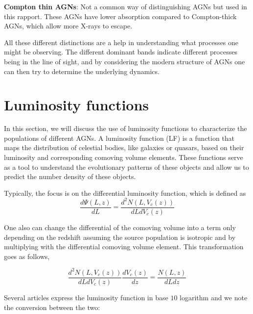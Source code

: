 \documentclass{article}
\begin{document}
\textbf{Compton thin AGNs}: 
Not a common way of distinguishing AGNs but used in this rapport. These AGNs have lower absorption compared to Compton-thick AGNs, which allow more X-rays to escape. 



All these different distinctions are a help in understanding what processes one might be observing. The different
dominant bands indicate different processes being in the line of sight, and by considering the modern structure of 
AGNs one can then try to determine the underlying dynamics.  

 



\section{ Luminosity functions}
In this section, we will discuss the use of luminosity functions to characterize the populations of different AGNs. 
A luminosity function (LF) is a function that maps the distribution of celestial bodies, like galaxies or quasars,
based on their luminosity and corresponding comoving volume elements. These functions serve as a tool to understand the evolutionary patterns of these objects and allow us 
to predict the number density of these objects. 

Typically, the focus is on the differential luminosity function, which is defined as
\begin{equation}
    \frac{d\Psi(L,z)}{dL} = \frac{d^2N(L,V_c(z))}{dLdV_c(z)}
\end{equation}

One also can change the differential of the comoving volume into a term only depending on the redshift assuming the source population is isotropic and by multiplying with the differential comoving volume element. This 
transformation goes as follows, 

\begin{equation}
    \frac{d^2N(L,V_c(z))}{dLdV_c(z)}\frac{dV_c(z)}{dz} = \frac{N(L,z)}{dLdz}
\end{equation}


Several articles express the luminosity function in base $10$ logarithm and we note the conversion between the two:
\end{document}
